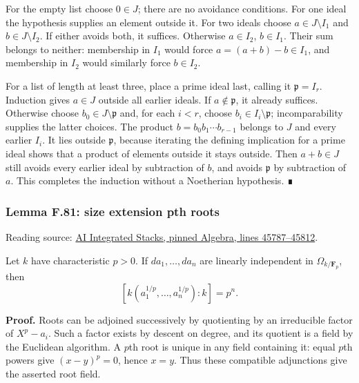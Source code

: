 \documentclass[11pt,a4paper,openany]{report}
\begin{document}
For the empty list choose \(0\in J\); there are no avoidance conditions. For one ideal the hypothesis supplies an element outside it. For two ideals choose \(a\in J\setminus I_1\) and \(b\in J\setminus I_2\). If either avoids both, it suffices. Otherwise \(a\in I_2\), \(b\in I_1\). Their sum belongs to neither: membership in \(I_1\) would force \(a=(a+b)-b\in I_1\), and membership in \(I_2\) would similarly force \(b\in I_2\).

For a list of length at least three, place a prime ideal last, calling it \(\mathfrak p=I_r\). Induction gives \(a\in J\) outside all earlier ideals. If \(a\notin\mathfrak p\), it already suffices. Otherwise choose \(b_0\in J\setminus\mathfrak p\) and, for each \(i<r\), choose \(b_i\in I_i\setminus\mathfrak p\); incomparability supplies the latter choices. The product \(b=b_0b_1\cdots b_{r-1}\) belongs to \(J\) and every earlier \(I_i\). It lies outside \(\mathfrak p\), because iterating the defining implication for a prime ideal shows that a product of elements outside it stays outside. Then \(a+b\in J\) still avoids every earlier ideal by subtraction of \(b\), and avoids \(\mathfrak p\) by subtraction of \(a\). This completes the induction without a Noetherian hypothesis. ∎

\label{AG-RG-S05-algebra-lemma-size-extension-pth-roots}

\subsubsection{Lemma F.81: size extension pth roots}\label{AG-RG-S05-lemma-f.81-size-extension-pth-roots}

Reading source: \href{https://github.com/KokunoYumeto/unofficial-stacks-project-ai-drafts/blob/565b10e987aba5969b21145a0833f42d69f96790/algebra.tex\#L45787-L45812}{AI Integrated Stacks, pinned Algebra, lines 45787--45812}.

Let \(k\) have characteristic \(p>0\). If \(da_1,\ldots,da_n\) are linearly independent in \(\Omega_{k/\mathbf F_p}\), then \[[k(a_1^{1/p},\ldots,a_n^{1/p}):k]=p^n.\]

\textbf{Proof.} Roots can be adjoined successively by quotienting by an irreducible factor of \(X^p-a_i\). Such a factor exists by descent on degree, and its quotient is a field by the Euclidean algorithm. A \(p\)th root is unique in any field containing it: equal \(p\)th powers give \((x-y)^p=0\), hence \(x=y\). Thus these compatible adjunctions give the asserted root field.
\end{document}
